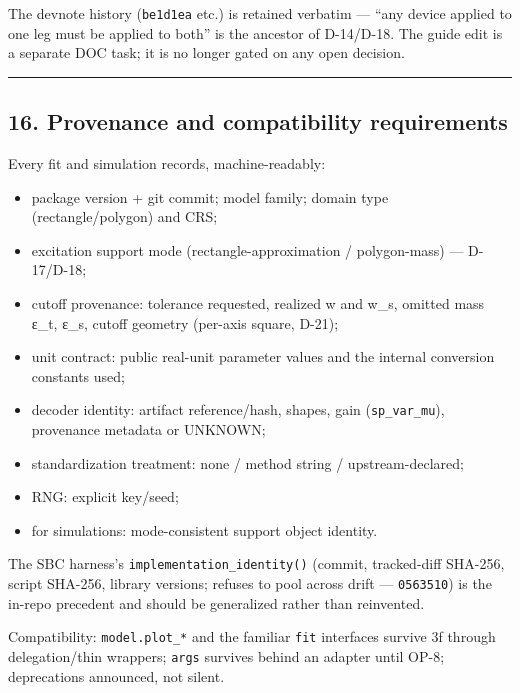 \documentclass[
  10pt,
]{article}
\providecommand{\tightlist}{%
  \setlength{\itemsep}{0pt}\setlength{\parskip}{0pt}}
\begin{document}
The devnote history (\texttt{be1d1ea} etc.) is retained verbatim --- ``any device applied to one leg must be applied to both'' is the ancestor of D-14/D-18. The guide edit is a separate DOC task; it is no longer gated on any open decision.

\begin{center}\rule{0.5\linewidth}{0.5pt}\end{center}

\hypertarget{provenance-and-compatibility-requirements}{%
\subsection{16. Provenance and compatibility requirements}\label{provenance-and-compatibility-requirements}}

Every fit and simulation records, machine-readably:

\begin{itemize}
\tightlist
\item
  package version + git commit; model family; domain type (rectangle/polygon) and CRS;
\item
  excitation support mode (rectangle-approximation / polygon-mass) --- D-17/D-18;
\item
  cutoff provenance: tolerance requested, realized w and w\_s, omitted mass ε\_t, ε\_s, cutoff geometry (per-axis square, D-21);
\item
  unit contract: public real-unit parameter values and the internal conversion constants used;
\item
  decoder identity: artifact reference/hash, shapes, gain (\texttt{sp\_var\_mu}), provenance metadata or UNKNOWN;
\item
  standardization treatment: none / method string / upstream-declared;
\item
  RNG: explicit key/seed;
\item
  for simulations: mode-consistent support object identity.
\end{itemize}

The SBC harness's \texttt{implementation\_\allowbreak{}identity()} (commit, tracked-diff SHA-256, script SHA-256, library versions; refuses to pool across drift --- \texttt{0563510}) is the in-repo precedent and should be generalized rather than reinvented.

Compatibility: \texttt{model.plot\_*} and the familiar \texttt{fit} interfaces survive 3f through delegation/thin wrappers; \texttt{args} survives behind an adapter until OP-8; deprecations announced, not silent.
\end{document}
